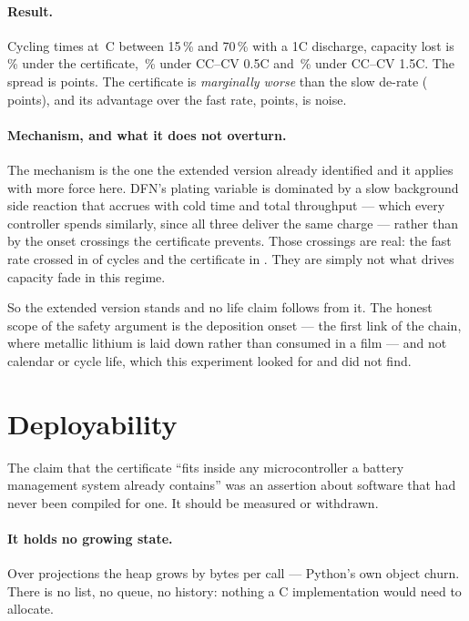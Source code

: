 \documentclass[11pt,letterpaper]{article}
\theoremstyle{definition}
\theoremstyle{remark}
\newcommand{\SI}[2]{#1\,#2}
\newcommand{\degreeCelsius}{\degC}
\newcommand{\degC}{\ifmmode{^\circ}\mathrm{C}\else\textdegree C\fi}
\begin{document}
\paragraph{Result.} Cycling \clCycles{} times at \SI{\clAmb}{\degreeCelsius} between 15\,\% and 70\,\%
with a 1C discharge, capacity lost is \clCertFade\,\% under the certificate, \clSlowFade\,\%
under CC--CV 0.5C and \clFastFade\,\% under CC--CV 1.5C. The spread is \clSpread{} points. The
certificate is \emph{marginally worse} than the slow de-rate (\clVsSafe{} points), and its
advantage over the fast rate, \clVsFast{} points, is noise.

\paragraph{Mechanism, and what it does not overturn.} The mechanism is the one the extended version
already identified and it applies with more force here. DFN's plating variable is dominated by a
slow background side reaction that accrues with cold time and total throughput --- which every
controller spends similarly, since all three deliver the same charge --- rather than by the
onset crossings the certificate prevents. Those crossings are real: the fast rate crossed in
\clFastOnset{} of \clCycles{} cycles and the certificate in \clCertOnset. They are simply not
what drives capacity fade in this regime.

So the extended version stands and no life claim follows from it. The honest scope of the safety
argument is the deposition onset --- the first link of the chain, where metallic lithium is laid
down rather than consumed in a film --- and not calendar or cycle life, which this experiment
looked for and did not find.


\section{Deployability}\label{sec:embedded}

The claim that the certificate ``fits inside any microcontroller a battery management system
already contains'' was an assertion about software that had never been compiled for one. It
should be measured or withdrawn.

\paragraph{It holds no growing state.} Over \embCalls{} projections the heap grows by
\embBytesPerCall{} bytes per call --- Python's own object churn. There is no list, no queue, no
history: nothing a C implementation would need to allocate.
\end{document}
